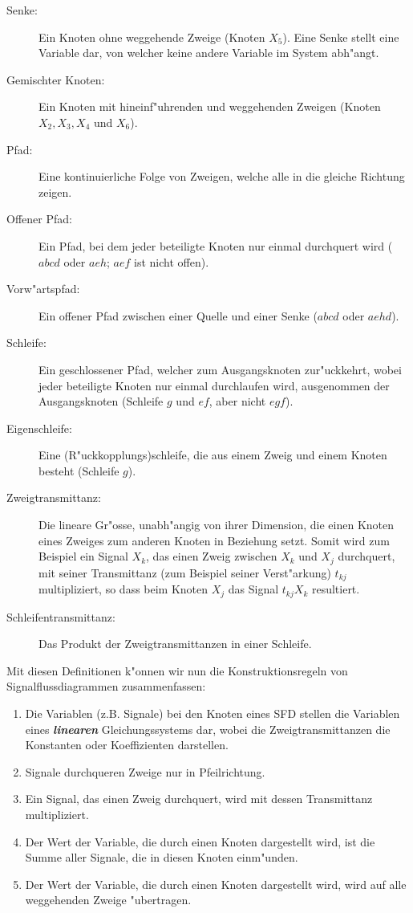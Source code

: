 \begin{description}
\item[Senke:] Ein Knoten ohne weggehende Zweige (Knoten
  $X_5$). Eine Senke stellt eine Variable dar, von welcher keine andere
  Variable im System abh"angt.
\item[Gemischter Knoten:] Ein Knoten mit
  hineinf"uhrenden und weggehenden Zweigen (Knoten $X_2, X_3, X_4$ und
  $X_6$).  
\item[Pfad:] Eine kontinuierliche Folge von Zweigen, welche alle
  in die gleiche Richtung zeigen.  
\item[Offener Pfad:] Ein Pfad, bei dem
  jeder beteiligte Knoten nur einmal durchquert wird ($abcd$ oder $aeh$;
  $aef$ ist nicht offen).  
\item[Vorw"artspfad:]  Ein offener Pfad zwischen
  einer Quelle und einer Senke ($abcd$ oder $aehd$).  
\item[Schleife:] Ein geschlossener Pfad, welcher zum
  Ausgangsknoten zur"uckkehrt, wobei jeder beteiligte Knoten nur
  einmal durchlaufen wird, ausgenommen der Ausgangsknoten (Schleife
  $g$ und $ef$, aber nicht $egf$).  
\item[Eigenschleife:] Eine
  (R"uckkopplungs)schleife, die aus einem Zweig und einem Knoten
  besteht (Schleife $g$).
\item[Zweigtransmittanz:] Die lineare
  Gr"osse, unabh"angig von ihrer Dimension, die einen Knoten eines
  Zweiges zum anderen Knoten in Beziehung setzt. Somit wird zum
  Beispiel ein Signal $X_k$, das einen Zweig zwischen $X_k$ und $X_j$
  durchquert, mit seiner Transmittanz (zum Beispiel seiner
  Verst"arkung) $t_{kj}$ multipliziert, so dass beim Knoten $X_j$ das
  Signal $t_{kj}X_k$ resultiert.  
\item[Schleifentransmittanz:] Das Produkt der
  Zweigtransmittanzen in einer Schleife.
\end{description}
\newpage
\nit Mit diesen Definitionen
k"onnen wir nun die Konstruktionsregeln von Signalflussdiagrammen
zusammenfassen: 
\begin{enumerate}
\item Die Variablen (z.B. Signale) bei den Knoten eines
  SFD stellen die Variablen eines {\it\textbf{linearen}}
  Gleichungssystems dar, wobei die Zweigtransmittanzen die Konstanten
  oder Koeffizienten darstellen.
\item Signale durchqueren Zweige nur in
  Pfeilrichtung.
\item Ein Signal, das einen Zweig durchquert, wird mit
  dessen Transmittanz multipliziert. 
\item Der Wert der Variable, die durch einen Knoten dargestellt wird,
  ist die Summe aller Signale, die
  in diesen Knoten einm"unden. 
\item Der Wert der Variable, die durch einen Knoten dargestellt wird,
  wird auf alle weggehenden Zweige "ubertragen.
\end{enumerate}
